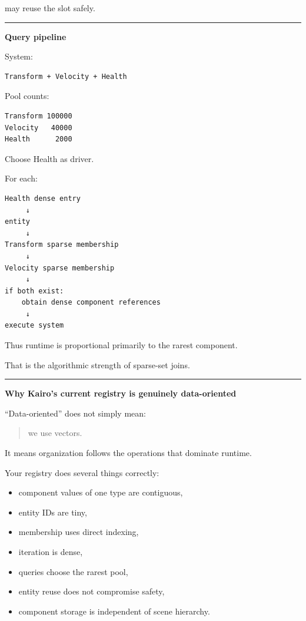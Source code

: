 may reuse the slot safely.

\begin{center}\rule{0.5\linewidth}{0.5pt}\end{center}

\textbf{Query pipeline}

System:

\begin{verbatim}
Transform + Velocity + Health
\end{verbatim}

Pool counts:

\begin{verbatim}
Transform 100000
Velocity   40000
Health      2000
\end{verbatim}

Choose Health as driver.

For each:

\begin{verbatim}
Health dense entry
     ↓
entity
     ↓
Transform sparse membership
     ↓
Velocity sparse membership
     ↓
if both exist:
    obtain dense component references
     ↓
execute system
\end{verbatim}

Thus runtime is proportional primarily to the rarest component.

That is the algorithmic strength of sparse-set joins.

\begin{center}\rule{0.5\linewidth}{0.5pt}\end{center}

\textbf{Why Kairo's current registry is genuinely data-oriented}

``Data-oriented'' does not simply mean:

\begin{quote}
we use vectors.
\end{quote}

It means organization follows the operations that dominate runtime.

Your registry does several things correctly:

\begin{itemize}
\tightlist
\item
  component values of one type are contiguous,
\item
  entity IDs are tiny,
\item
  membership uses direct indexing,
\item
  iteration is dense,
\item
  queries choose the rarest pool,
\item
  entity reuse does not compromise safety,
\item
  component storage is independent of scene hierarchy.
\end{itemize}


